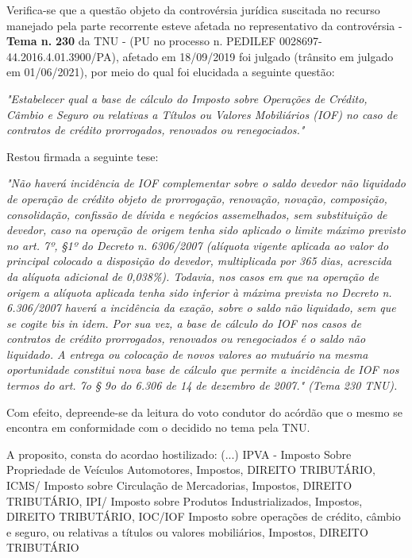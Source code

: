 \documentclass[12pt]{article}
\begin{document}
\justifying
\noindent Verifica-se que a questão objeto da controvérsia jurídica suscitada no recurso manejado pela parte recorrente esteve afetada no representativo da controvérsia - \textbf{Tema n. }\textbf{230} da TNU - (PU no processo n. PEDILEF 0028697-44.2016.4.01.3900/PA),  afetado em 18/09/2019 foi julgado (trânsito em julgado em 01/06/2021), por meio do qual foi elucidada a seguinte questão:

\noindent \textit{"Estabelecer qual a base de cálculo do Imposto sobre Operações de Crédito, Câmbio e Seguro ou relativas a Títulos ou Valores Mobiliários (IOF) no caso de contratos de crédito prorrogados, renovados ou renegociados."}

\noindent Restou firmada a seguinte tese:

\noindent \textit{"Não haverá incidência de IOF complementar sobre o saldo devedor não liquidado de operação de crédito objeto de prorrogação, renovação, novação, composição, consolidação, confissão de dívida e negócios assemelhados, sem substituição de devedor, caso na operação de origem tenha sido aplicado o limite máximo previsto no art. 7º, §1º do Decreto n. 6306/2007 (alíquota vigente aplicada ao valor do principal colocado a disposição do devedor, multiplicada por 365 dias, acrescida da alíquota adicional de 0,038\%). Todavia, nos casos em que na operação de origem a alíquota aplicada tenha sido inferior à máxima prevista no Decreto n. 6.306/2007 haverá a incidência da exação, sobre o saldo não liquidado, sem que se cogite bis in idem. Por sua vez, a base de cálculo do IOF nos casos de contratos de crédito prorrogados, renovados ou renegociados é o saldo não liquidado. A entrega ou colocação de novos valores ao mutuário na mesma oportunidade constitui nova base de cálculo que permite a incidência de IOF nos termos do art. 7o § 9o do 6.306 de 14 de dezembro de 2007." (Tema 230 TNU).}

\noindent Com efeito, depreende-se da leitura do voto condutor do acórdão que o mesmo se encontra em conformidade com o decidido no  tema pela TNU.

\noindent A proposito, consta do acordao hostilizado: (...) IPVA - Imposto Sobre Propriedade de Veículos Automotores, Impostos, DIREITO TRIBUTÁRIO, ICMS/ Imposto sobre Circulação de Mercadorias, Impostos, DIREITO TRIBUTÁRIO, IPI/ Imposto sobre Produtos Industrializados, Impostos, DIREITO TRIBUTÁRIO, IOC/IOF Imposto sobre operações de crédito, câmbio e seguro, ou relativas a títulos ou valores mobiliários, Impostos, DIREITO TRIBUTÁRIO
\end{document}
